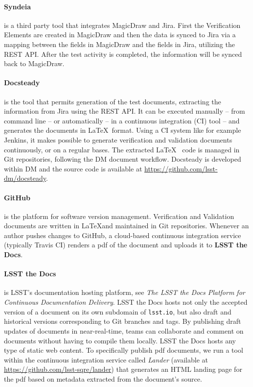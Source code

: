 \paragraph{Syndeia}
is a third party tool that integrates MagicDraw and Jira. 
First the Verification Elements are created in MagicDraw and then the data is synced to Jira
via a mapping between the fields in MagicDraw and the fields in Jira, utilizing the REST API.
After the test activity is completed, the information will be synced back to MagicDraw.

\paragraph{Docsteady}
is the tool that permits generation of the test documents, extracting the information from Jira using the REST API.
It can be executed manually -- from command line -- or automatically -- in a continuous integration (CI) tool -- 
and generates the documents in \LaTeX~format.
Using a CI system like for example Jenkins, it makes possible to generate verification and validation documents continuously, or on a regular bases.
The extracted \LaTeX~ code is managed in Git repositories, following the  DM document workflow.
Docsteady is developed within DM and the source code is available at \url{https://github.com/lsst-dm/docsteady}.

\paragraph{GitHub}
is the platform for software version management.
Verification and Validation documents are written in \LaTeX and maintained in Git repositories.
Whenever an author pushes changes to GitHub, a cloud-based continuous integration service 
(typically Travis CI) renders a pdf of the document and uploads it to \textbf{LSST the Docs}.

\paragraph{LSST the Docs}
is LSST's documentation hosting platform, see \textit{The LSST the Docs Platform for Continuous Documentation Delivery}\cite{SQR-006}.
LSST the Docs hosts not only the accepted version of a document on its own subdomain of \texttt{lsst.io}, but also draft and
historical versions corresponding to Git branches and tags.
By publishing draft updates of documents in near-real-time, teams can collaborate and comment on documents without having to
compile them locally.
LSST the Docs hosts any type of static web content.
To specifically publish pdf documents, we run a tool within the continuous integration service called \textit{Lander}
(available at \url{https://github.com/lsst-sqre/lander})
that generates an HTML landing page for the pdf based on metadata extracted from the document's source.

